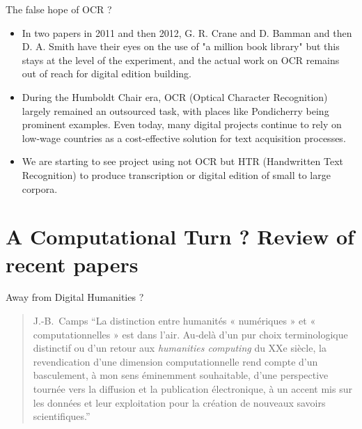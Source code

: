 \documentclass[aspectratio=169]{beamer}
\begin{document}
\begin{frame}{The false hope of OCR ?}
    \begin{itemize}
        \item In two papers in 2011 and then 2012, G. R. Crane and D. Bamman and then D. A. Smith have their eyes on the use of "a million book library" but this stays at the level of the experiment, and the actual work on OCR remains out of reach for digital edition building.
        \item During the Humboldt Chair era, OCR (Optical Character Recognition) largely remained an outsourced task, with places like Pondicherry being prominent examples. Even today, many digital projects continue to rely on low-wage countries as a cost-effective solution for text acquisition processes.
        \item We are starting to see project using not OCR but HTR (Handwritten Text Recognition) to produce transcription or digital edition of small to large corpora.
    \end{itemize}
\end{frame}




\section{A Computational Turn ? Review of recent papers}

\begin{frame}{Away from Digital Humanities ?}
    
    \begin{quote}{J.-B.~Camps}
    \enquote{La distinction entre humanités « numériques » et « computationnelles » est dans l’air. Au‑delà d’un pur choix terminologique distinctif ou d’un retour aux \textit{humanities computing} du XXe siècle, la revendication d’une dimension computationnelle rend compte d’un basculement, à mon sens éminemment souhaitable, d’une perspective tournée vers la diffusion et la publication électronique, à un accent mis sur les données et leur exploitation pour la création de nouveaux savoirs scientifiques.}\footnotemark
    \end{quote}

\end{frame}
\end{document}
